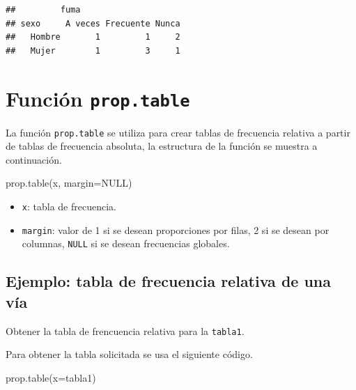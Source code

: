 \documentclass[
]{book}
\makeatletter
\newenvironment{Shaded}{\begin{snugshade}}{\end{snugshade}}
\newcommand{\AttributeTok}[1]{\textcolor[rgb]{0.77,0.63,0.00}{#1}}
\newcommand{\ConstantTok}[1]{\textcolor[rgb]{0.00,0.00,0.00}{#1}}
\newcommand{\FunctionTok}[1]{\textcolor[rgb]{0.00,0.00,0.00}{#1}}
\newcommand{\NormalTok}[1]{#1}
\providecommand{\tightlist}{%
  \setlength{\itemsep}{0pt}\setlength{\parskip}{0pt}}
\newenvironment{kframe}{%
\medskip{}
\setlength{\fboxsep}{.8em}
 \def\at@end@of@kframe{}%
 \ifinner\ifhmode%
  \def\at@end@of@kframe{\end{minipage}}%
  \begin{minipage}{\columnwidth}%
 \fi\fi%
 \def\FrameCommand##1{\hskip\@totalleftmargin \hskip-\fboxsep
 \colorbox{shadecolor}{##1}\hskip-\fboxsep
     \hskip-\linewidth \hskip-\@totalleftmargin \hskip\columnwidth}%
 \MakeFramed {\advance\hsize-\width
   \@totalleftmargin\z@ \linewidth\hsize
   \@setminipage}}%
 {\par\unskip\endMakeFramed%
 \at@end@of@kframe}
\renewenvironment{Shaded}{\begin{kframe}}{\end{kframe}}
\makeatother
\begin{document}
\begin{verbatim}
##         fuma
## sexo     A veces Frecuente Nunca
##   Hombre       1         1     2
##   Mujer        1         3     1
\end{verbatim}

\hypertarget{funciuxf3n-prop.table}{%
\section{\texorpdfstring{Función \texttt{prop.table} }{Función prop.table }}\label{funciuxf3n-prop.table}}

La función \texttt{prop.table} se utiliza para crear tablas de frecuencia relativa a partir de tablas de frecuencia absoluta, la estructura de la función se muestra a continuación.

\begin{Shaded}
\begin{Highlighting}[]
\FunctionTok{prop.table}\NormalTok{(x, }\AttributeTok{margin=}\ConstantTok{NULL}\NormalTok{)}
\end{Highlighting}
\end{Shaded}

\begin{itemize}
\tightlist
\item
  \texttt{x}: tabla de frecuencia.
\item
  \texttt{margin}: valor de 1 si se desean proporciones por filas, 2 si se desean por columnas, \texttt{NULL} si se desean frecuencias globales.
\end{itemize}

\hypertarget{ejemplo-tabla-de-frecuencia-relativa-de-una-vuxeda}{%
\subsection*{Ejemplo: tabla de frecuencia relativa de una vía}\label{ejemplo-tabla-de-frecuencia-relativa-de-una-vuxeda}}

Obtener la tabla de frencuencia relativa para la \texttt{tabla1}.

Para obtener la tabla solicitada se usa el siguiente código.

\begin{Shaded}
\begin{Highlighting}[]
\FunctionTok{prop.table}\NormalTok{(}\AttributeTok{x=}\NormalTok{tabla1)}
\end{Highlighting}
\end{Shaded}
\end{document}
